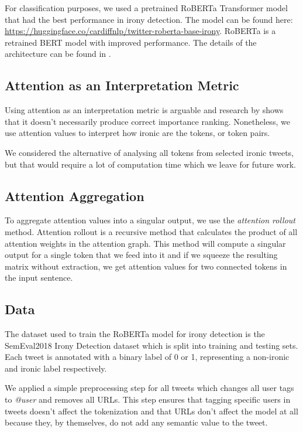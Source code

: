 \documentclass[10pt, a4paper]{article}
\begin{document}
For classification purposes, we used a pretrained RoBERTa Transformer model that had the best performance in irony detection.
The model can be found here: \url{https://huggingface.co/cardiffnlp/twitter-roberta-base-irony}.
RoBERTa is a retrained BERT model with improved performance. The details of the architecture can be found in \citep{roberta}. 

\subsection{Attention as an Interpretation Metric}

Using attention as an interpretation metric is arguable and research by \cite{attention-interpretable} shows that it doesn't necessarily produce correct importance ranking.
Nonetheless, we use attention values to interpret how ironic are the tokens, or token pairs.

We considered the alternative of analysing all tokens from selected ironic tweets, but that would require a lot of computation time which we leave for future work.

\subsection{Attention Aggregation}
\label{sec:attaggr}

To aggregate attention values into a singular output, we use the \textit{attention rollout} method.
Attention rollout is a recursive method that calculates the product of all attention weights in the attention graph. \citep{quantifying-attention-flow}
This method will compute a singular output for a single token that we feed into it and if we squeeze the resulting matrix without extraction, we get attention values for two connected tokens in the input sentence.

\subsection{Data}

The dataset used to train the RoBERTa model for irony detection is the SemEval2018 Irony Detection dataset \citep{van-hee-etal-2018-semeval} which is split into training and testing sets.
Each tweet is annotated with a binary label of 0 or 1, representing a non-ironic and ironic label respectively.

We applied a simple preprocessing step for all tweets which changes all user tags to \textit{@user} and removes all URLs.
This step ensures that tagging specific users in tweets doesn't affect the tokenization and that URLs don't affect the model at all because they, by themselves, do not add any semantic value to the tweet.
\end{document}
